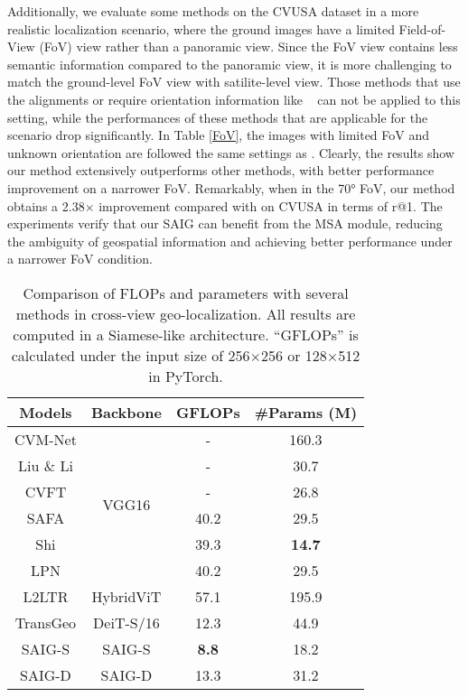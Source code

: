 \documentclass[sn-basic,iicol]{sn-jnl}
\theoremstyle{thmstyletwo}\newtheorem{example}{Example}\newtheorem{remark}{Remark}
\theoremstyle{thmstylethree}\newtheorem{definition}{Definition}
\begin{document}
 Additionally, we evaluate some methods on the CVUSA dataset in a more realistic localization scenario, where the ground images have a limited Field-of-View (FoV) view rather than a panoramic view. Since the FoV view contains less semantic information compared to the panoramic view, it is more challenging to match the ground-level FoV view with satilite-level view.
Those methods that use the alignments or require orientation information like ~\citep{liu2019lending} can not be applied to this setting, while the performances of these methods that are applicable for the scenario drop significantly.
In Table \ref{FoV}, the images with limited FoV and unknown orientation are followed the same settings as \citep{DSM2020}. Clearly, the results show our method extensively outperforms other methods, with better performance improvement on a narrower FoV. Remarkably, when in the 70° FoV, our method obtains a 2.38$\times$ improvement compared with \citep{DSM2020} on CVUSA in terms of r@1. The experiments verify that our SAIG can benefit from the MSA module, reducing the ambiguity of geospatial information and achieving better performance under a narrower FoV condition.






\begin{table}[ht]
\setlength{\abovecaptionskip}{0.2cm}
\centering
\begin{tabular}{cc|c|c}
\toprule
Models & Backbone & GFLOPs & \#Params (M) \\\midrule
CVM-Net &\multirow{6}{*}{VGG16}& - & 160.3\\
Liu \& Li & ~ & - & 30.7\\
CVFT & ~ & - & 26.8\\
SAFA& ~ & 40.2 & 29.5 \\ 
Shi& ~ & 39.3 & \textbf{14.7} \\
LPN & ~ & 40.2 & 29.5 \\ \midrule
L2LTR& HybridViT & 57.1 & 195.9 \\
TransGeo& DeiT-S/16 & 12.3 & 44.9 \\
\midrule
SAIG-S & SAIG-S & \textbf{8.8} & 18.2 \\
SAIG-D & SAIG-D & 13.3 & 31.2 \\\bottomrule
\end{tabular}
\caption{Comparison of FLOPs and parameters with several methods in cross-view geo-localization. All results are computed in a Siamese-like architecture. “GFLOPs” is calculated under the input size of 256$\times$256 or 128$\times$512 in PyTorch.}
\label{model complexity}
\vspace{-3pt}
\end{table}
\end{document}
